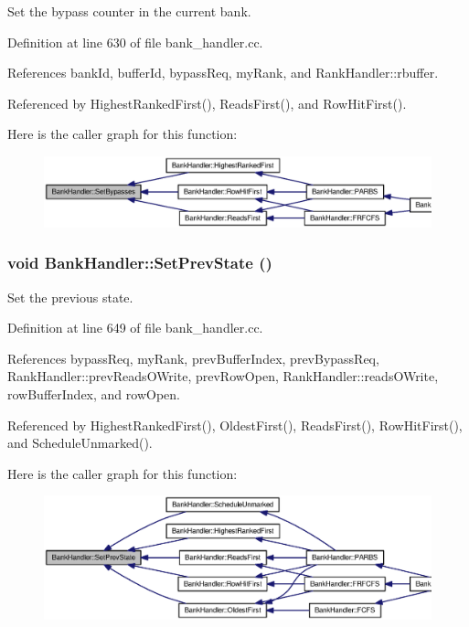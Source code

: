 Set the bypass counter in the current bank. 



Definition at line 630 of file bank\_\-handler.cc.

References bankId, bufferId, bypassReq, myRank, and RankHandler::rbuffer.

Referenced by HighestRankedFirst(), ReadsFirst(), and RowHitFirst().

Here is the caller graph for this function:\nopagebreak
\begin{figure}[H]
\begin{center}
\leavevmode
\includegraphics[width=420pt]{classBankHandler_d05b974c262629de52cf42219540f0e9_icgraph}
\end{center}
\end{figure}
\subsubsection[{SetPrevState}]{\setlength{\rightskip}{0pt plus 5cm}void BankHandler::SetPrevState ()}\label{classBankHandler_94781ff33ba7408091db65ec52d14fb9}


Set the previous state. 



Definition at line 649 of file bank\_\-handler.cc.

References bypassReq, myRank, prevBufferIndex, prevBypassReq, RankHandler::prevReadsOWrite, prevRowOpen, RankHandler::readsOWrite, rowBufferIndex, and rowOpen.

Referenced by HighestRankedFirst(), OldestFirst(), ReadsFirst(), RowHitFirst(), and ScheduleUnmarked().

Here is the caller graph for this function:\nopagebreak
\begin{figure}[H]
\begin{center}
\leavevmode
\includegraphics[width=420pt]{classBankHandler_94781ff33ba7408091db65ec52d14fb9_icgraph}
\end{center}
\end{figure}
